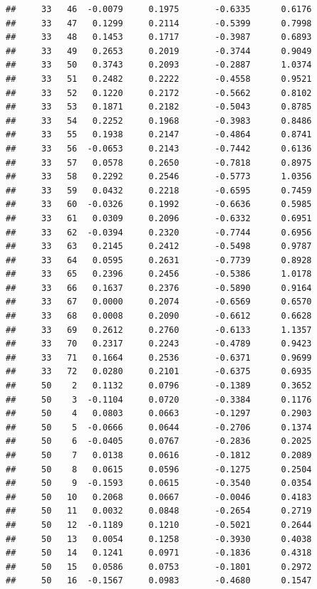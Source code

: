 \documentclass[
]{article}
\begin{document}
\begin{verbatim}
##     33   46  -0.0079     0.1975       -0.6335      0.6176 
##     33   47   0.1299     0.2114       -0.5399      0.7998 
##     33   48   0.1453     0.1717       -0.3987      0.6893 
##     33   49   0.2653     0.2019       -0.3744      0.9049 
##     33   50   0.3743     0.2093       -0.2887      1.0374 
##     33   51   0.2482     0.2222       -0.4558      0.9521 
##     33   52   0.1220     0.2172       -0.5662      0.8102 
##     33   53   0.1871     0.2182       -0.5043      0.8785 
##     33   54   0.2252     0.1968       -0.3983      0.8486 
##     33   55   0.1938     0.2147       -0.4864      0.8741 
##     33   56  -0.0653     0.2143       -0.7442      0.6136 
##     33   57   0.0578     0.2650       -0.7818      0.8975 
##     33   58   0.2292     0.2546       -0.5773      1.0356 
##     33   59   0.0432     0.2218       -0.6595      0.7459 
##     33   60  -0.0326     0.1992       -0.6636      0.5985 
##     33   61   0.0309     0.2096       -0.6332      0.6951 
##     33   62  -0.0394     0.2320       -0.7744      0.6956 
##     33   63   0.2145     0.2412       -0.5498      0.9787 
##     33   64   0.0595     0.2631       -0.7739      0.8928 
##     33   65   0.2396     0.2456       -0.5386      1.0178 
##     33   66   0.1637     0.2376       -0.5890      0.9164 
##     33   67   0.0000     0.2074       -0.6569      0.6570 
##     33   68   0.0008     0.2090       -0.6612      0.6628 
##     33   69   0.2612     0.2760       -0.6133      1.1357 
##     33   70   0.2317     0.2243       -0.4789      0.9423 
##     33   71   0.1664     0.2536       -0.6371      0.9699 
##     33   72   0.0280     0.2101       -0.6375      0.6935 
##     50    2   0.1132     0.0796       -0.1389      0.3652 
##     50    3  -0.1104     0.0720       -0.3384      0.1176 
##     50    4   0.0803     0.0663       -0.1297      0.2903 
##     50    5  -0.0666     0.0644       -0.2706      0.1374 
##     50    6  -0.0405     0.0767       -0.2836      0.2025 
##     50    7   0.0138     0.0616       -0.1812      0.2089 
##     50    8   0.0615     0.0596       -0.1275      0.2504 
##     50    9  -0.1593     0.0615       -0.3540      0.0354 
##     50   10   0.2068     0.0667       -0.0046      0.4183 
##     50   11   0.0032     0.0848       -0.2654      0.2719 
##     50   12  -0.1189     0.1210       -0.5021      0.2644 
##     50   13   0.0054     0.1258       -0.3930      0.4038 
##     50   14   0.1241     0.0971       -0.1836      0.4318 
##     50   15   0.0586     0.0753       -0.1801      0.2972 
##     50   16  -0.1567     0.0983       -0.4680      0.1547 

\end{verbatim}
\end{document}
